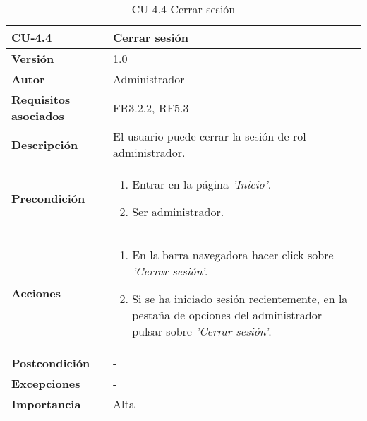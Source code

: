 \begin{table}[h!]
	\centering
	\begin{tabularx}{\linewidth}{ p{} p{} }
		\toprule
		\textbf{CU-4.4}    & \textbf{Cerrar sesión}\\
		\toprule
		\textbf{Versión}              & 1.0    \\
		\textbf{Autor}                & Administrador \\
		\textbf{Requisitos asociados} & FR3.2.2, RF5.3\\
		\textbf{Descripción}          & El usuario puede cerrar la sesión de rol administrador.\\
        \textbf{Precondición}         &  
  		\begin{enumerate}
			\def\labelenumi{\arabic{enumi}.}
			\tightlist
			\item Entrar en la página \textit{'Inicio'}.
                \item Ser administrador.
		\end{enumerate}\\
		\textbf{Acciones}             &
		\begin{enumerate}
			\def\labelenumi{\arabic{enumi}.}
			\tightlist
			\item En la barra navegadora hacer click sobre \textit{'Cerrar sesión'}.
            \item Si se ha iniciado sesión recientemente, en la pestaña de opciones del administrador pulsar sobre \textit{'Cerrar sesión'}.
            
		\end{enumerate}\\
		\textbf{Postcondición}     &   - \\
		\textbf{Excepciones}          & - \\
		\textbf{Importancia}          & Alta \\
		\bottomrule
	\end{tabularx}
	\caption{CU-4.4 Cerrar sesión}
\end{table}

